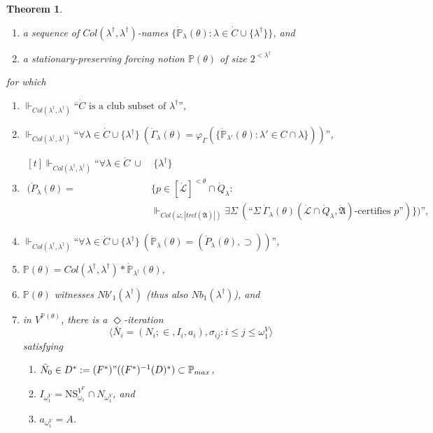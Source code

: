 \documentclass[12pt, twoside]{memoir}
\numberwithin{equation}{section}
\newtheorem{thm}{Theorem}[section]
\theoremstyle{definition}
\theoremstyle{remark}
\theoremstyle{definition}
\theoremstyle{definition}
\theoremstyle{definition}
\theoremstyle{remark}
\begin{document}
\begin{thm}
\begin{enumerate}[label=(\arabic*)]
    \item a sequence of $Col(\lambda^{\dagger}, \lambda^{\dagger})$-names $\{\dot{\mathbb{P}}_{\lambda}(\theta) : \lambda \in \dot{C} \cup \{\lambda^{\dagger}\}\}$, and
    \item a stationary-preserving forcing notion $\mathbb{P}(\theta)$ of size $2^{< \lambda^{\dagger}}$
\end{enumerate}
for which
\begin{enumerate}[label=(\alph*)]
    \item $\Vdash_{Col(\lambda^{\dagger}, \lambda^{\dagger})} \text{``} \dot{C} \text{ is a club subset of } \lambda^{\dagger} \text{''}$,
    \item $\Vdash_{Col(\lambda^{\dagger}, \lambda^{\dagger})} \text{``} \forall \lambda \in \dot{C} \cup \{\lambda^{\dagger}\} \ (\dot{\Gamma}_{\lambda}(\theta) = \varphi_{\Gamma}(\{\dot{\mathbb{P}}_{\lambda'}(\theta) : \lambda' \in C \cap \lambda\})) \text{''}$,
    \item \!
    $\begin{aligned}[t]
        \Vdash_{Col(\lambda^{\dagger}, \lambda^{\dagger})} \text{``} \forall \lambda \in \dot{C} \ \cup & \ \{\lambda^{\dagger}\} \\
        (\dot{P}_{\lambda}(\theta) = \ & \{p \in [\dot{\mathcal{L}}]^{< \theta} \cap \dot{Q}_{\lambda} : \\
        & \Vdash_{Col(\omega, |trcl(\dot{\mathfrak{A}})|)} \exists \Sigma \ (\text{``} \Sigma \ \dot{\Gamma}_{\lambda}(\theta) (\dot{\mathcal{L}} \cap \dot{Q}_{\lambda}, \dot{\mathfrak{A}}) \text{-certifies } p \text{''})\}) \text{'',}
    \end{aligned}$
    \item $\Vdash_{Col(\lambda^{\dagger}, \lambda^{\dagger})} \text{``} \forall \lambda \in \dot{C} \cup \{\lambda^{\dagger}\} \ (\dot{\mathbb{P}}_{\lambda}(\theta) = (\dot{P}_{\lambda}(\theta), \supset)) \text{''}$,
    \item $\mathbb{P}(\theta) = Col(\lambda^{\dagger}, \lambda^{\dagger}) * \dot{\mathbb{P}}_{\lambda^{\dagger}}(\theta)$,
    \item $\mathbb{P}(\theta)$ witnesses $Nb'_1(\lambda^{\dagger})$ (thus also $Nb_1(\lambda^{\dagger})$), and
    \item in $V^{\mathbb{P}(\theta)}$, there is a $\Diamond$-iteration $$\langle \bar{N}_i = (N_i; \in, I_i, a_i), \sigma_{ij} : i \leq j \leq \omega_1^V \rangle$$ satisfying 
    \begin{enumerate}[label=(\arabic*), leftmargin=40pt]
        \item $\bar{N}_0 \in D^* := (F^*) " ((F^*)^{-1}(D)^*) \subset \mathbb{P}_{max}$,
        \item $I_{\omega_1^V} = \mathrm{NS}_{\omega_1}^{V^{\mathbb{P}}} \cap N_{\omega_1^V}$, and
        \item $a_{\omega_1^V} = A$.
    \end{enumerate}
\end{enumerate}
\end{thm}
\end{document}
